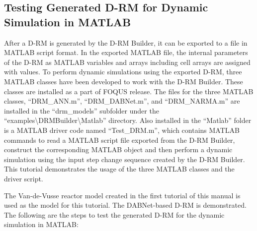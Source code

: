 \subsection{Testing Generated D-RM for Dynamic Simulation in MATLAB}
After a D-RM is generated by the D-RM Builder, it can be exported to a file in MATLAB script format.  In the exported MATLAB file, the internal parameters of the D-RM as MATLAB variables and arrays including cell arrays are assigned with values.  To perform dynamic simulations using the exported D-RM, three MATLAB classes have been developed to work with the D-RM Builder.  These classes are installed as a part of FOQUS release.  The files for the three MATLAB classes, ``DRM\_ANN.m'', ``DRM\_DABNet.m'', and ``DRM\_NARMA.m'' are installed in the ``drm\_models'' subfolder under the ``examples\textbackslash DRMBuilder\textbackslash Matlab'' directory.  Also installed in the ``Matlab'' folder is a MATLAB driver code named ``Test\_DRM.m'', which contains MATLAB commands to read a MATLAB script file exported from the D-RM Builder, construct the corresponding MATLAB object and then perform a dynamic simulation using the input step change sequence created by the D-RM Builder.  This tutorial demonstrates the usage of the three MATLAB classes and the driver script.

The Van-de-Vusse reactor model created in the first tutorial of this manual is used as the model for this tutorial.  The DABNet-based D-RM is demonstrated.  The following are the steps to test the generated D-RM for the dynamic simulation in MATLAB:

